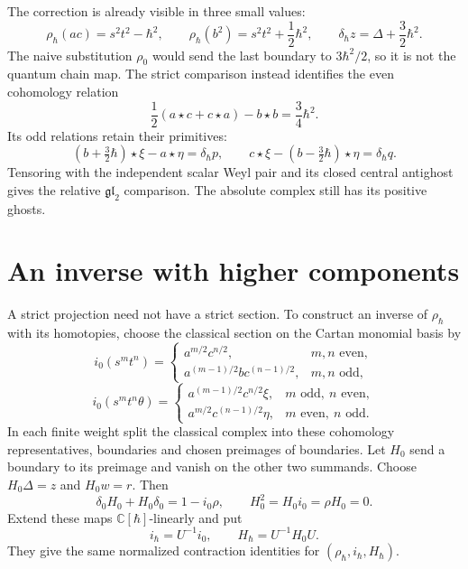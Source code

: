 The correction is already visible in three small values:
\begin{equation}\label{eq:vol2-relative-first-quantum-corrections}
 \rho_\hbar(ac)=s^2t^2-\hbar^2,\qquad
 \rho_\hbar(b^2)=s^2t^2+\frac12\hbar^2,\qquad
 \delta_\hbar z=\Delta+\frac32\hbar^2.
\end{equation}
The naive substitution $\rho_0$ would send the last boundary
to $3\hbar^2/2$, so it is not the quantum chain map.
The strict comparison instead identifies the even cohomology
relation
\[
 \frac12(a\star c+c\star a)-b\star b=\frac34\hbar^2.
\]
Its odd relations retain their primitives:
\[
 (b+\tfrac32\hbar)\star\xi-a\star\eta=\delta_\hbar p,
 \qquad
 c\star\xi-(b-\tfrac32\hbar)\star\eta=\delta_\hbar q.
\]
Tensoring with the independent scalar Weyl pair and its closed
central antighost gives the relative $\mathfrak{gl}_2$ comparison.
The absolute complex still has its positive ghosts.

\section{An inverse with higher components}
\label{sec:vol2-relative-higher-inverse}

A strict projection need not have a strict section. To construct
an inverse of $\rho_\hbar$ with its homotopies, choose the classical
section on the Cartan monomial basis by
\[
 i_0(s^mt^n)=
 \begin{cases}
  a^{m/2}c^{n/2},&m,n\text{ even},\\
  a^{(m-1)/2}bc^{(n-1)/2},&m,n\text{ odd},
 \end{cases}
\]
\[
 i_0(s^mt^n\theta)=
 \begin{cases}
  a^{(m-1)/2}c^{n/2}\xi,&m\text{ odd},\ n\text{ even},\\
  a^{m/2}c^{(n-1)/2}\eta,&m\text{ even},\ n\text{ odd}.
 \end{cases}
\]
In each finite weight split the classical complex into these
cohomology representatives, boundaries and chosen preimages of
boundaries. Let $H_0$ send a boundary to its preimage and vanish on
the other two summands. Choose $H_0\Delta=z$ and $H_0w=r$.
Then
\[
 \delta_0H_0+H_0\delta_0=1-i_0\rho,\qquad
 H_0^2=H_0i_0=\rho H_0=0.
\]
Extend these maps $\mathbb C[\hbar]$-linearly and put
\[
 i_\hbar=U^{-1}i_0,\qquad
 H_\hbar=U^{-1}H_0U.
\]
They give the same normalized contraction identities for
$(\rho_\hbar,i_\hbar,H_\hbar)$.

